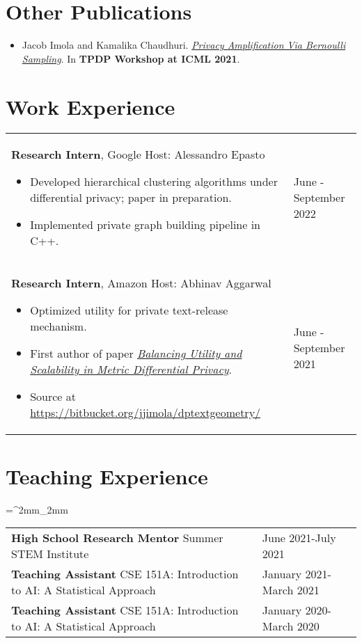 \documentclass[11pt]{article}
\begin{document}
\section*{Other Publications}
\begin{itemize}
	\setlength\itemsep{-0.3em}
	\item
		Jacob Imola and Kamalika Chaudhuri.
		\textit{\href{https://arxiv.org/abs/2105.10594}{Privacy Amplification Via Bernoulli Sampling}}. In \textbf{TPDP Workshop at ICML 2021}.
\end{itemize}


\section*{Work Experience}
\begin{tabu}{X[4, l] X[1, l]}
	\textbf{Research Intern}, Google \newline
	Host: Alessandro Epasto
	\begin{itemize}
	\setlength\itemsep{-0.3em}
	\item Developed hierarchical clustering algorithms under differential privacy; paper in preparation.
	\item Implemented private graph building pipeline in C++.
	\end{itemize}
&
	June - September 2022 \\
	\textbf{Research Intern}, Amazon \newline
	Host: Abhinav Aggarwal 
	\begin{itemize}
		\setlength\itemsep{-0.3em}
		\item Optimized utility for private text-release mechanism.
		\item First author of paper \textit{\href{https://openreview.net/pdf?id=B0l8-wLjql5}{Balancing Utility and Scalability in Metric Differential Privacy}}. 
		\item Source at \href{https://bitbucket.org/jjimola/dptextgeometry/}{https://bitbucket.org/jjimola/dptextgeometry/}
	\end{itemize}
&
	June - September 2021 \\
\end{tabu}

\section*{Teaching Experience}
\tabulinesep=^2mm_2mm
\begin{tabu}{X[4,l] X[1,l]}
  \textbf{High School Research Mentor} \newline
    Summer STEM Institute 
  & June 2021-July 2021 \\
	\textbf{Teaching Assistant} \newline
    CSE 151A: Introduction to AI: A Statistical Approach 
  & January 2021-March 2021 \\
  \textbf{Teaching Assistant} \newline
    CSE 151A: Introduction to AI: A Statistical Approach 
  & January 2020-March 2020 \\
\end{tabu}
\end{document}
